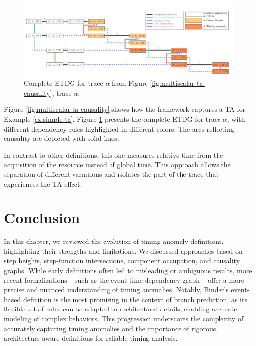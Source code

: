 \begin{figure}[htbp]
    \centering
    \includegraphics[width=\textwidth]{figures/ETDG.png}
    \caption{Complete ETDG for trace $\alpha$ from Figure \ref{fig:multiscalar-ta-causality}, trace $\alpha$. }
    \label{fig:ETDG}
\end{figure}

Figure \ref{fig:multiscalar-ta-causality} shows how the framework captures a TA for Example \ref{ex:simple-ta}. Figure \ref{fig:ETDG} presents the complete ETDG for trace $\alpha$, with different dependency rules highlighted in different colors. The arcs reflecting causality are depicted with solid lines.

In contrast to other definitions, this one measures relative time from the acquisition of the resource instead of global time. This approach allows the separation of different variations and isolates the part of the trace that experiences the TA effect.


\section{Conclusion}

In this chapter, we reviewed the evolution of timing anomaly definitions, highlighting their strengths and limitations. We discussed approaches based on step heights, step-function intersections, component occupation, and causality graphs. While early definitions often led to misleading or ambiguous results, more recent formalizations -- such as the event time dependency graph -- offer a more precise and nuanced understanding of timing anomalies. Notably, Binder's event-based definition is the most promising in the context of branch prediction, as its flexible set of rules can be adapted to architectural details, enabling accurate modeling of complex behaviors. This progression underscores the complexity of accurately capturing timing anomalies and the importance of rigorous, architecture-aware definitions for reliable timing analysis.
